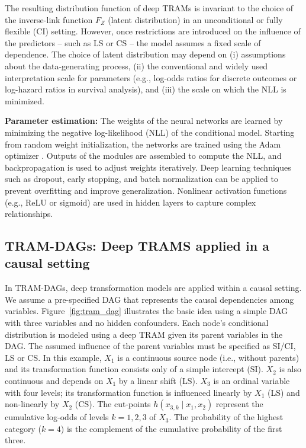 The resulting distribution function of deep TRAMs is invariant to the choice of the inverse-link function $F_Z$ (latent distribution) in an unconditional \citep{hothorn2018} or fully flexible (CI) setting. However, once restrictions are introduced on the influence of the predictors -- such as LS or CS -- the model assumes a fixed scale of dependence. The choice of latent distribution may depend on (i) assumptions about the data-generating process, (ii) the conventional and widely used interpretation scale for parameters (e.g., log-odds ratios for discrete outcomes or log-hazard ratios in survival analysis), and (iii) the scale on which the NLL is minimized.


\textbf{Parameter estimation:} The weights of the neural networks are learned by minimizing the negative log-likelihood (NLL) of the conditional model. Starting from random weight initialization, the networks are trained using the Adam optimizer \citep{kingma2015}. Outputs of the modules are assembled to compute the NLL, and backpropagation is used to adjust weights iteratively. Deep learning techniques such as dropout, early stopping, and batch normalization can be applied to prevent overfitting and improve generalization. Nonlinear activation functions (e.g., ReLU or sigmoid) are used in hidden layers to capture complex relationships.




\subsection{TRAM-DAGs: Deep TRAMS applied in a causal setting} \label{sec:tram_dags}



In TRAM-DAGs, deep transformation models are applied within a causal setting. We assume a pre-specified DAG that represents the causal dependencies among variables. 
Figure~\ref{fig:tram_dag} illustrates the basic idea using a simple DAG with three variables and no hidden confounders. Each node's conditional distribution is modeled using a deep TRAM given its parent variables in the DAG. The assumed influence of the parent variables must be specified as SI/CI, LS or CS. In this example, $X_1$ is a continuous source node (i.e., without parents) and its transformation function consists only of a simple intercept (SI). $X_2$ is also continuous and depends on $X_1$ by a linear shift (LS). $X_3$ is an ordinal variable with four levels; its transformation function is influenced linearly by $X_1$ (LS) and non-linearly by $X_2$ (CS). The cut-points $h(x_{3,k} \mid x_1, x_2)$ represent the cumulative log-odds of levels $k = 1, 2, 3$ of $X_3$. The probability of the highest category ($k = 4$) is the complement of the cumulative probability of the first three.


